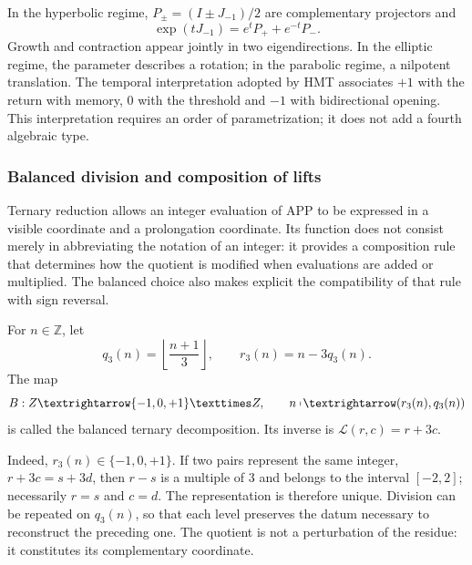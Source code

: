 In the hyperbolic regime, \(P_\pm=(I\pm J_{-1})/2\) are complementary projectors and
\[
 \exp(tJ_{-1})=e^tP_++e^{-t}P_-.
\]
Growth and contraction appear jointly in two eigendirections. In the elliptic regime, the parameter describes a rotation; in the parabolic regime, a nilpotent translation. The temporal interpretation adopted by HMT associates \(+1\) with the return with memory, \(0\) with the threshold and \(-1\) with bidirectional opening. This interpretation requires an order of parametrization; it does not add a fourth algebraic type.


\subsubsection{Balanced division and composition of lifts}
\label{x_reciprocidad:trit-ampl-div-balanceada}

Ternary reduction allows an integer evaluation of APP to be expressed in a
visible coordinate and a prolongation coordinate. Its function does not consist
merely in abbreviating the notation of an integer: it provides a composition
rule that determines how the quotient is modified when evaluations are added or
multiplied. The balanced choice also makes explicit the
compatibility of that rule with sign reversal.

\begin{definition}
\label{x_reciprocidad:trit-ampl-def-coordenadas}
For \(n\in\mathbb Z\), let
\[
 q_3(n)=\left\lfloor\frac{n+1}{3}\right\rfloor,\qquad
 r_3(n)=n-3q_3(n).
\]
The map
\[
 \mathcal B:\mathbb Z\longrightarrow\TRIT\times\mathbb Z,\qquad
 n\longmapsto(r_3(n),q_3(n))
\]
is called the balanced ternary decomposition. Its inverse is
\(\mathcal L(r,c)=r+3c\).
\end{definition}

Indeed, \(r_3(n)\in\{-1,0,+1\}\). If two pairs represent the same integer,
\(r+3c=s+3d\), then \(r-s\) is a multiple of \(3\) and belongs to the interval
\([-2,2]\); necessarily \(r=s\) and \(c=d\). The representation is therefore
unique. Division can be repeated on \(q_3(n)\), so that each level
preserves the datum necessary to reconstruct the preceding one. The quotient is not a
perturbation of the residue: it constitutes its complementary coordinate.

